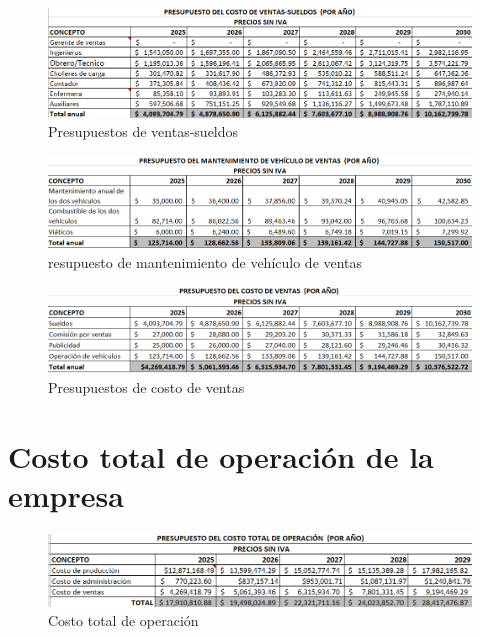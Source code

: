 \begin{figure}[H]
    \centering	
    \includegraphics[width=.9\textwidth]{chapters/ELC_6.png} 
    \caption{Presupuestos de ventas-sueldos}
\label{fig:macrolocalizacion}
\end{figure}

\begin{figure}[H]
    \centering	
    \includegraphics[width=.8\textwidth]{chapters/ELC_7.png} 
    \caption{resupuesto de mantenimiento de vehículo de ventas}
\label{fig:macrolocalizacion}
\end{figure}

\begin{figure}[H]
    \centering	
    \includegraphics[width=.8\textwidth]{chapters/ELC_8.png} 
    \caption{Presupuestos de costo de ventas}
\label{fig:macrolocalizacion}
\end{figure}


\section{Costo total de operación de la empresa}

\begin{figure}[H]
    \centering	
    \includegraphics[width=.7\textwidth]{chapters/ELC_9.png} 
    \caption{Costo total de operación}
\label{fig:macrolocalizacion}
\end{figure}




